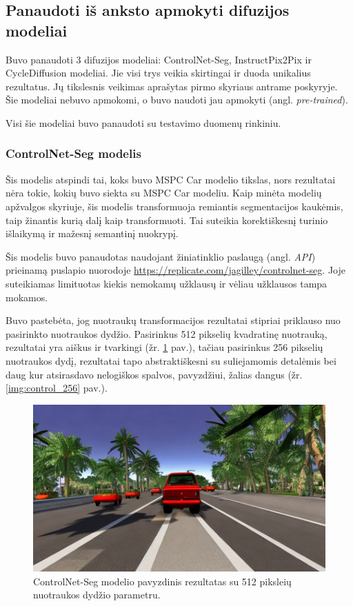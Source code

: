 \documentclass{VUMIFPSbakalaurinis}
\begin{document}
    
    \subsection{Panaudoti iš anksto apmokyti difuzijos modeliai}
        Buvo panaudoti 3 difuzijos modeliai: ControlNet-Seg, InstructPix2Pix ir CycleDiffusion modeliai. Jie visi trys veikia skirtingai ir duoda unikalius rezultatus. Jų tikslesnis veikimas aprašytas pirmo skyriaus antrame poskyryje. Šie modeliai nebuvo apmokomi, o buvo naudoti jau apmokyti (angl. \emph{pre-trained}).

        Visi šie modeliai buvo panaudoti su testavimo duomenų rinkiniu.

        \subsubsection{ControlNet-Seg modelis}
            Šis modelis atspindi tai, koks buvo MSPC Car modelio tikslas, nors rezultatai nėra tokie, kokių buvo siekta su MSPC Car modeliu. Kaip minėta modelių apžvalgos skyriuje, šis modelis transformuoja remiantis segmentacijos kaukėmis, taip žinantis kurią dalį kaip transformuoti. Tai suteikia korektiškesnį turinio išlaikymą ir mažesnį semantinį nuokrypį.

            Šis modelis buvo panaudotas naudojant žiniatinklio paslaugą (angl. \emph{API}) prieinamą puslapio nuorodoje \href{https://replicate.com/jagilley/controlnet-seg}{https://replicate.com/jagilley/controlnet-seg}. Joje suteikiamas limituotas kiekis nemokamų užklausų ir vėliau užklausos tampa mokamos.

            Buvo pastebėta, jog nuotraukų transformacijos rezultatai stipriai priklauso nuo pasirinkto nuotraukos dydžio. Pasirinkus 512 pikselių kvadratinę nuotrauką, rezultatai yra aiškus ir tvarkingi (žr. \ref{img:control_512} pav.), tačiau pasirinkus 256 pikselių nuotraukos dydį, rezultatai tapo abstraktiškesni su suliejamomis detalėmis bei daug kur atsirasdavo nelogiškos spalvos, pavyzdžiui, žalias dangus (žr. \ref{img:control_256} pav.). 

            \begin{figure}[H]
                \centering
                \includegraphics[scale=0.5]{img/diffusion/controlnet/512}
                \caption{ControlNet-Seg modelio pavyzdinis rezultatas su 512 piksleių nuotraukos dydžio parametru.}
                \label{img:control_512}
            \end{figure}
\end{document}
